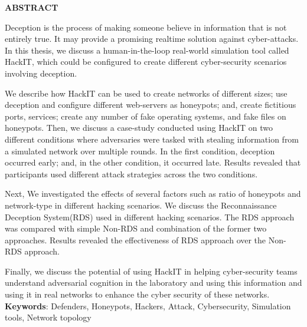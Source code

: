 \begin{center}
{\Large \bf ABSTRACT}
\end{center}
\noindent

Deception is the process of making someone believe in information that is not entirely true. It may provide a promising realtime solution against cyber-attacks. In this thesis, we discuss a human-in-the-loop real-world simulation tool called HackIT, which could be configured to create different cyber-security scenarios involving deception. 

We describe how HackIT can be used to create networks of different sizes; use deception and configure different web-servers as honeypots; and, create fictitious ports, services; create any number of fake operating systems, and fake files on honeypots. Then, we discuss a case-study conducted using HackIT on two different conditions where adversaries were tasked with stealing information from a simulated network over multiple rounds. In the first condition, deception occurred early; and, in the other condition, it occurred late. Results revealed that participants used different attack strategies across the two conditions.

Next, We investigated the effects of several factors such as ratio of honeypots and network-type in different hacking scenarios. We discuss the Reconnaissance Deception System(RDS) used in different hacking scenarios. The RDS approach was compared with simple Non-RDS and combination of the former two approaches. Results revealed the effectiveness of RDS approach over the Non-RDS approach.

Finally, we discuss the potential of using HackIT in helping cyber-security teams understand adversarial cognition in the laboratory and using this information and using it in real networks to enhance the cyber security of these networks.\\
{\bf Keywords}: Defenders, Honeypots, Hackers, Attack, Cybersecurity, Simulation tools, Network topology

\newpage
~\clearpage 
